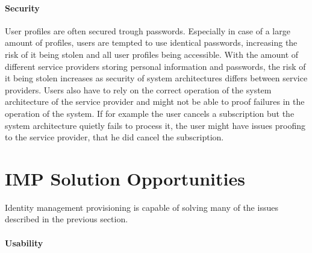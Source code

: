 \paragraph{Security}

User profiles are often secured trough passwords. Especially in case of a large amount of profiles, users are tempted to use identical passwords, increasing the risk of it being stolen and all user profiles being accessible. With the amount of different service providers storing personal information and passwords, the risk of it being stolen increases as security of system architectures differs between service providers. Users also have to rely on the correct operation of the system architecture of the service provider and might not be able to proof failures in the operation of the system. If for example the user cancels a subscription but the system architecture quietly fails to process it, the user might have issues proofing to the service provider, that he did cancel the subscription.


\section{IMP Solution Opportunities}

Identity management provisioning is capable of solving many of the issues described in the previous section.

\paragraph{Usability}

